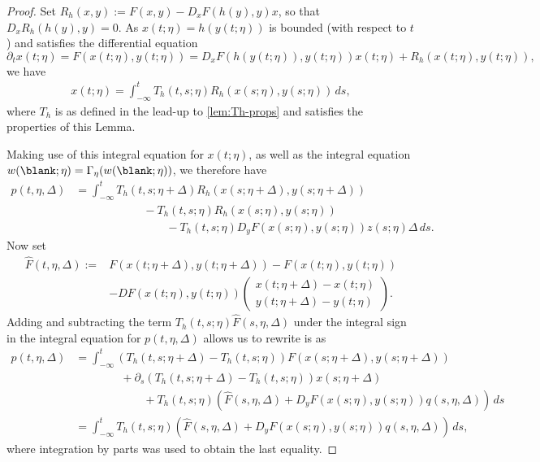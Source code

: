\documentclass[a4paper]{siamart190516}
\begin{document}
 \begin{proof}
Set $R_h(x,y) := F(x,y)-D_xF(h(y),y) x$, so that $D_x R_h(h(y),y) = 0$. As $x(t; \eta) = h(y(t; \eta))$ is bounded (with respect to $t$) and satisfies the differential equation
\[
\partial_t x(t; \eta) = F(x(t;\eta), y(t;\eta)) = D_x F(h(y(t;\eta)),y(t; \eta)) x(t;\eta) + R_h(x(t;\eta), y(t;\eta)),
\]
we have
\begin{align*}
x(t;\eta) =   \int_{-\infty}^t T_h(t,s;\eta) R_h(x(s;\eta),y(s;\eta)) \, ds,
\end{align*}
where $T_h$ is as defined in the lead-up to \cref{lem:Th-props} and satisfies the properties of this Lemma.  

Making use of this integral equation for $x(t;\eta)$, as well as the integral equation $w(\blank; \eta)=\Gamma_{\eta}(w(\blank; \eta))$, we therefore have
 \begin{align*}
 p(t, \eta, \Delta) &= \int_{-\infty}^t T_h(t,s; \eta+\Delta) R_h(x(s; \eta+\Delta), y(s; \eta+\Delta)) \\
 &\qquad \qquad \qquad - T_h(t,s; \eta) R_h(x(s; \eta), y(s; \eta))\\
 &\qquad \qquad \qquad \qquad - T_h(t,s;\eta) D_y F(x(s;\eta),y(s;\eta)) z(s; \eta) \Delta  \, ds.
 \end{align*}
 Now set
 \begin{align*}
  \hat{F}(t, \eta, \Delta) := &F(x(t;\eta+\Delta), y(t;\eta+\Delta)) - F(x(t;\eta), y(t;\eta)) \\
& - D F(x(t;\eta), y(t;\eta)) \begin{pmatrix} x(t;\eta+\Delta) - x(t;\eta) \\  y(t;\eta+\Delta)-y(t;\eta)  \end{pmatrix}.
  \end{align*}
Adding and subtracting the term $T_h(t,s;\eta) \hat{F}(s, \eta, \Delta)$ under the integral sign in the integral equation for $p(t, \eta, \Delta)$ allows us to rewrite is as
 \begin{align*}
 p(t, \eta, \Delta) &=  \int_{-\infty}^t \left( T_h(t,s; \eta+\Delta) - T_h(t,s;\eta) \right)  F(x(s; \eta+\Delta), y(s; \eta+\Delta))  \\
 &\qquad \qquad  + \partial_s \left(T_h(t,s;\eta+\Delta) - T_h(t,s;\eta) \right)  x(s; \eta+\Delta)  \\
 &\qquad \qquad \qquad + T_h(t,s;\eta) \left(  \hat{F}(s, \eta, \Delta) + D_y F(x(s;\eta),y(s;\eta)) q(s,\eta,\Delta)  \right)  \, ds \\
 &=  \int_{-\infty}^t T_h(t,s;\eta) \left(  \hat{F}(s, \eta, \Delta) + D_y F(x(s;\eta),y(s;\eta)) q(s,\eta,\Delta)  \right)  \, ds,
 \end{align*}
 where integration by parts was used to obtain the last equality.


\end{proof}
\end{document}
